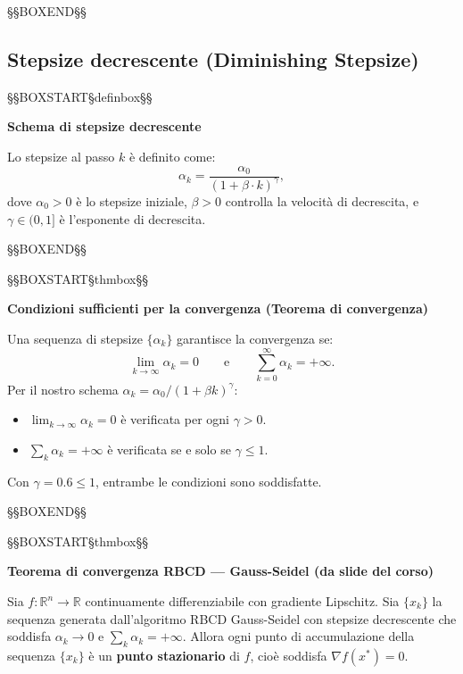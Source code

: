 \documentclass[12pt,a4paper]{article}
\theoremstyle{definition}
\newcommand{\R}{\mathbb{R}}
\newcommand{\grad}{\nabla}
\begin{document}
\noindent §§BOXEND§§



\subsection{Stepsize decrescente (Diminishing Stepsize)}



\noindent §§BOXSTART§definbox§§

\textbf{Schema di stepsize decrescente}


Lo stepsize al passo $k$ è definito come:
\[
  \alpha_k = \frac{\alpha_0}{(1 + \beta \cdot k)^\gamma},
\]
dove $\alpha_0 > 0$ è lo stepsize iniziale, $\beta > 0$ controlla la velocità di decrescita,
e $\gamma \in (0,1]$ è l'esponente di decrescita.


\noindent §§BOXEND§§





\noindent §§BOXSTART§thmbox§§

\textbf{Condizioni sufficienti per la convergenza (Teorema di convergenza)}


Una sequenza di stepsize $\{\alpha_k\}$ garantisce la convergenza se:
\[
  \lim_{k \to \infty} \alpha_k = 0 \qquad \text{e} \qquad \sum_{k=0}^{\infty} \alpha_k = +\infty.
\]
Per il nostro schema $\alpha_k = \alpha_0 / (1 + \beta k)^\gamma$:
\begin{itemize}
  \item $\lim_{k\to\infty} \alpha_k = 0$ è verificata per ogni $\gamma > 0$.
  \item $\sum_k \alpha_k = +\infty$ è verificata se e solo se $\gamma \leq 1$.
\end{itemize}
Con $\gamma = 0.6 \leq 1$, entrambe le condizioni sono soddisfatte.


\noindent §§BOXEND§§





\noindent §§BOXSTART§thmbox§§

\textbf{Teorema di convergenza RBCD — Gauss-Seidel (da slide del corso)}


Sia $f : \R^n \to \R$ continuamente differenziabile con gradiente Lipschitz.
Sia $\{x_k\}$ la sequenza generata dall'algoritmo RBCD Gauss-Seidel con stepsize decrescente
che soddisfa $\alpha_k \to 0$ e $\sum_k \alpha_k = +\infty$.
Allora ogni punto di accumulazione della sequenza $\{x_k\}$ è un \textbf{punto stazionario}
di $f$, cioè soddisfa $\grad f(x^*) = 0$.
\end{document}
